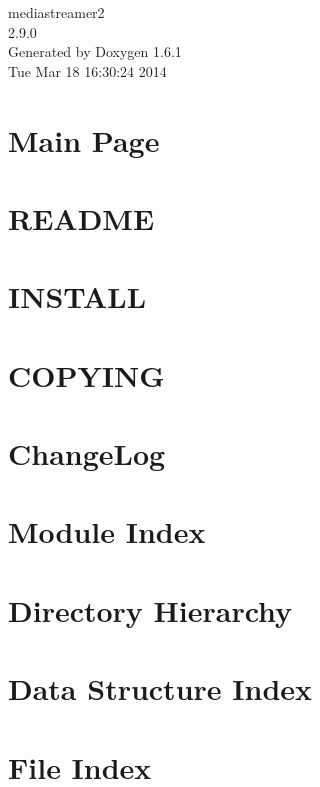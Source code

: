 \documentclass[a4paper]{book}
\begin{document}
\begin{titlepage}
\vspace*{7cm}
\begin{center}
{\Large mediastreamer2 \\[1ex]\large 2.9.0 }\\
\vspace*{1cm}
{\large Generated by Doxygen 1.6.1}\\
\vspace*{0.5cm}
{\small Tue Mar 18 16:30:24 2014}\\
\end{center}
\end{titlepage}
\clearemptydoublepage
{}
\tableofcontents
\clearemptydoublepage
{}
\chapter{Main Page}
\label{index}
\chapter{README}
\label{mediastreamer2_readme}

\chapter{INSTALL}
\label{mediastreamer2_install}

\chapter{COPYING}
\label{mediastreamer2_license}

\chapter{ChangeLog}
\label{mediastreamer2_changelog}

\chapter{Module Index}

\chapter{Directory Hierarchy}

\chapter{Data Structure Index}

\chapter{File Index}

\end{document}
